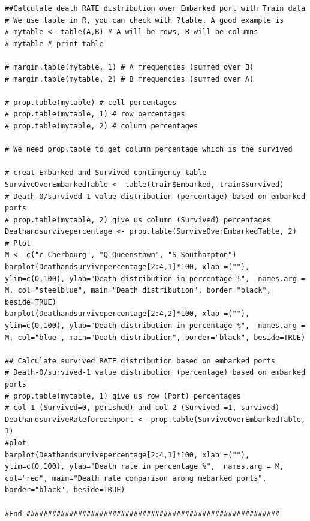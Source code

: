 \documentclass[
]{book}
\begin{document}
\begin{verbatim}
##Calculate death RATE distribution over Embarked port with Train data
# We use table in R, you can check with ?table. A good example is
# mytable <- table(A,B) # A will be rows, B will be columns
# mytable # print table

# margin.table(mytable, 1) # A frequencies (summed over B)
# margin.table(mytable, 2) # B frequencies (summed over A)

# prop.table(mytable) # cell percentages
# prop.table(mytable, 1) # row percentages
# prop.table(mytable, 2) # column percentages

# We need prop.table to get column percentage which is the survived

# creat Embarked and Survived contingency table
SurviveOverEmbarkedTable <- table(train$Embarked, train$Survived)
# Death-0/survived-1 value distribution (percentage) based on embarked ports
# prop.table(mytable, 2) give us column (Survived) percentages
Deathandsurvivepercentage <- prop.table(SurviveOverEmbarkedTable, 2)
# Plot
M <- c("c-Cherbourg", "Q-Queenstown", "S-Southampton")
barplot(Deathandsurvivepercentage[2:4,1]*100, xlab =(""), ylim=c(0,100), ylab="Death distribution in percentage %",  names.arg = M, col="steelblue", main="Death distribution", border="black", beside=TRUE)
barplot(Deathandsurvivepercentage[2:4,2]*100, xlab =(""), ylim=c(0,100), ylab="Death distribution in percentage %",  names.arg = M, col="blue", main="Death distribution", border="black", beside=TRUE)

## Calculate survived RATE distribution based on embarked ports
# Death-0/survived-1 value distribution (percentage) based on embarked ports
# prop.table(mytable, 1) give us row (Port) percentages
# col-1 (Survived=0, perished) and col-2 (Survived =1, survived)
DeathandsurviveRateforeachport <- prop.table(SurviveOverEmbarkedTable, 1)
#plot
barplot(Deathandsurvivepercentage[2:4,1]*100, xlab =(""), ylim=c(0,100), ylab="Death rate in percentage %",  names.arg = M, col="red", main="Death rate comparison among mebarked ports", border="black", beside=TRUE)

#End ###########################################################
\end{verbatim}

  

\printindex
\end{document}
